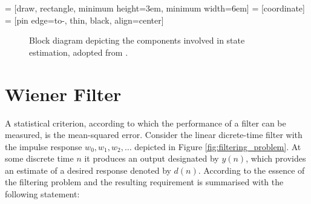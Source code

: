  = [draw, rectangle, minimum height=3em, minimum width=6em]
 = [coordinate]
 = [pin edge={to-, thin, black}, align=center]

\begin{figure}
\centering
{}
\caption{Block diagram depicting the components involved in state estimation, adopted from \cite{haykin2002adaptive}.} \label{fig:state_estimation}
\end{figure}

\section{Wiener Filter}

A statistical criterion, according to which the performance of a filter can be measured, is the mean-squared error. Consider the linear dicrete-time filter with the impulse response $w_0, w_1, w_2, \dots$ depicted in Figure \ref{fig:filtering_problem}. At some discrete time $n$ it produces an output designated by $y(n)$, which provides an estimate of a desired response denoted by $d(n)$. According to \citeauthor{haykin2002adaptive} \cite{haykin2002adaptive} the essence of the filtering problem and the resulting requirement is summarised with the following statement:

